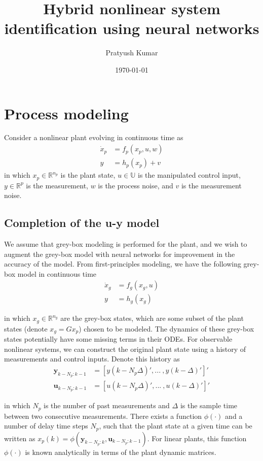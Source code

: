 \documentclass{article}
\title{Hybrid nonlinear system identification using neural networks}
\author{Pratyush Kumar}
\date{\today}
\newcommand{\bbR}{\mathbb{R}} \newcommand{\bbW}{\mathbb{W}}
\newcommand{\bbU}{\mathbb{U}} \newcommand{\bbI}{\mathbb{I}}
\begin{document}
\maketitle

\section{Process modeling}
Consider a nonlinear plant evolving in continuous time as
\begin{align*}
  \dot{x}_p &= f_p(x_p, u, w) \\
  y &= h_p(x_p) + v
\end{align*}
in which $x_p \in \bbR^{n_p}$ is the plant state, $u \in \bbU$ is the
manipulated control input, $y \in \bbR^p$ is the measurement, $w$ is the process
noise, and $v$ is the measurement noise.

\subsection{Completion of the u-y model}
We assume that grey-box modeling is performed for the plant, and we wish to
augment the grey-box model with neural networks for improvement in the accuracy
of the model. From first-principles modeling, we have the following grey-box
model in continuous time
\begin{align*}
  \dot{x}_g &= f_g(x_g, u) \\
  y &= h_g(x_g)
\end{align*}

in which $x_g \in \bbR^{n_g}$ are the grey-box states, which are some subset of
the plant states (denote $x_g = Gx_p$) chosen to be modeled. The dynamics of
these grey-box states potentially have some missing terms in their ODEs. For
observable nonlinear systems, we can construct the original plant state using a
history of measurements and control inputs. Denote this history as 
\begin{align*}
  \mathbf{y}_{k-N_p:k-1} &= [y(k-N_p\Delta)', ... \ , y(k-\Delta)']' \\
  \mathbf{u}_{k-N_p:k-1} &= [u(k-N_p\Delta)', 
                               ... \ , u(k-\Delta)']'
\end{align*}

in which $N_p$ is the number of past measurements and $\Delta$ is the sample
time between two consecutive measurements. There exists a function $\phi(\cdot)$
and a number of delay time steps $N_p$, such that the plant state at a given
time can be written as $x_p(k) = \phi(\mathbf{y}_{k-N_p:k},
\mathbf{u}_{k-N_p:k-1})$. For linear plants, this function $\phi(\cdot)$ is
known analytically in terms of the plant dynamic matrices.
\end{document}
